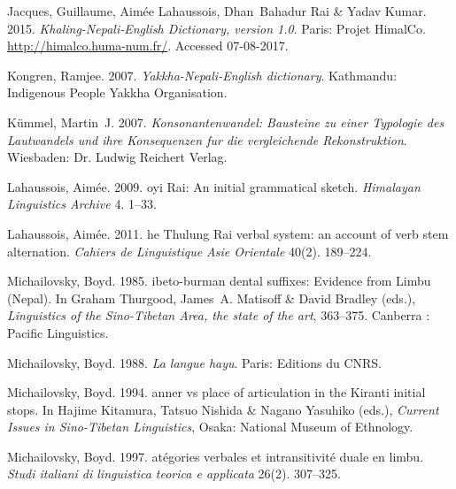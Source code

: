 \documentclass[oneside,a4paper,11pt]{article}
\begin{document}
\begin{thebibliography}{65}
Jacques, Guillaume, Aimée Lahaussois, Dhan~Bahadur Rai \& Yadav Kumar. 2015.
\newblock \emph{{K}haling-{N}epali-{E}nglish {D}ictionary, version 1.0}.
\newblock Paris: Projet HimalCo.
\newblock \urlprefix\url{http://himalco.huma-num.fr/}. Accessed 07-08-2017.

Kongren, Ramjee. 2007.
\newblock \emph{{Y}akkha-{N}epali-{E}nglish dictionary}.
\newblock Kathmandu: Indigenous People Yakkha Organisation.

Kümmel, Martin~J. 2007.
\newblock \emph{{K}onsonantenwandel: {B}austeine zu einer {T}ypologie des
  {L}autwandels und ihre {K}onsequenzen fur die vergleichende
  {R}ekonstruktion}.
\newblock Wiesbaden: Dr. Ludwig Reichert Verlag.

Lahaussois, Aimée. 2009.
oyi {R}ai: {A}n initial grammatical sketch.
\newblock \emph{Himalayan Linguistics Archive} 4. 1--33.

Lahaussois, Aimée. 2011.
he {T}hulung {R}ai verbal system: an account of verb stem
  alternation.
\newblock \emph{Cahiers de Linguistique Asie Orientale} 40(2). 189--224.

Michailovsky, Boyd. 1985.
ibeto-burman dental suffixes: {E}vidence from {L}imbu ({N}epal).
\newblock In Graham Thurgood, James~A. Matisoff \& David Bradley (eds.),
  \emph{{L}inguistics of the {S}ino-{T}ibetan {A}rea, the state of the art},
  363--375. Canberra : Pacific Linguistics.

Michailovsky, Boyd. 1988.
\newblock \emph{{L}a langue hayu}.
\newblock Paris: Editions du CNRS.

Michailovsky, Boyd. 1994.
anner vs place of articulation in the {K}iranti initial stops.
\newblock In Hajime Kitamura, Tatsuo Nishida \& Nagano Yasuhiko (eds.),
  \emph{{C}urrent {I}ssues in {S}ino-{T}ibetan {L}inguistics}, Osaka: National
  Museum of Ethnology.

Michailovsky, Boyd. 1997.
atégories verbales et intransitivité duale en limbu.
\newblock \emph{Studi italiani di linguistica teorica e applicata} 26(2).
  307--325.


\end{thebibliography}
\end{document}
